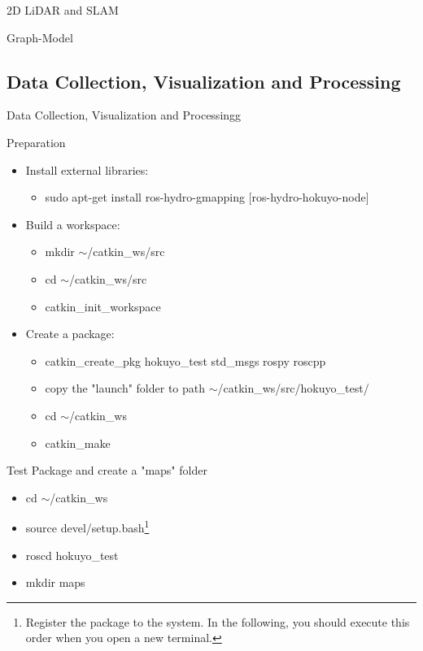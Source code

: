 \documentclass[10pt]{beamer}
\begin{document}
\begin{frame}[allowframebreaks]{2D LiDAR and SLAM}
\begin{block}{Graph-Model}
\begin{center}
   \end{center}
  \end{block}
 \end{frame}

 \subsection{Data Collection, Visualization and Processing}
 \begin{frame}[allowframebreaks]{Data Collection, Visualization and Processingg}
  \begin{block}{Preparation}
   \begin{itemize}
    \item Install external libraries:
    \begin{itemize}
	    \item sudo apt-get install ros-hydro-gmapping [ros-hydro-hokuyo-node]
    \end{itemize}
    \item Build a workspace:
    \begin{itemize}
	    \item mkdir $\sim$/catkin\_ws/src
	    \item cd $\sim$/catkin\_ws/src
	    \item catkin\_init\_workspace
    \end{itemize}
    \item Create a package:
    \begin{itemize}
	    \item catkin\_create\_pkg hokuyo\_test std\_msgs rospy roscpp
	    \item copy the "launch" folder to path $\sim$/catkin\_ws/src/hokuyo\_test/
	    \item cd $\sim$/catkin\_ws
	    \item catkin\_make
	\end{itemize}
   \end{itemize}
  \end{block}
  \begin{block}{Test Package and create a "maps" folder}
	  	\begin{itemize}
	  		\item cd $\sim$/catkin\_ws
	  		\item source devel/setup.bash\footnote{Register the package to the system. In the following, you should execute this order when you open a new terminal.}
	  		\item roscd hokuyo\_test
	  		\item mkdir maps

\end{itemize}
\end{block}
\end{frame}
\end{document}
